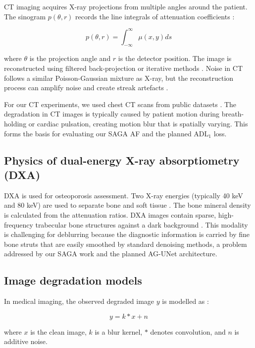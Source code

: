 CT imaging acquires X-ray projections from multiple angles around the patient. The sinogram \(p(\theta, r)\) records the line integrals of attenuation coefficients \citep{bushberg2011essential}:

\[
p(\theta, r) = \int_{-\infty}^{\infty} \mu(x, y) ds
\]

where \(\theta\) is the projection angle and \(r\) is the detector position. The image is reconstructed using filtered back-projection or iterative methods \citep{maier2018medical}. Noise in CT follows a similar Poisson-Gaussian mixture as X-ray, but the reconstruction process can amplify noise and create streak artefacts \citep{jin2017deep}.

For our CT experiments, we used chest CT scans from public datasets \citep{syed2024medical}. The degradation in CT images is typically caused by patient motion during breath-holding or cardiac pulsation, creating motion blur that is spatially varying. This forms the basis for evaluating our SAGA AF \citep{siju2026saga} and the planned ADL\(_1\) loss.

\subsection{Physics of dual-energy X-ray absorptiometry (DXA)}

DXA is used for osteoporosis assessment. Two X-ray energies (typically 40 keV and 80 keV) are used to separate bone and soft tissue \citep{bushberg2011essential}. The bone mineral density is calculated from the attenuation ratios. DXA images contain sparse, high-frequency trabecular bone structures against a dark background \citep{wani2021knee}. This modality is challenging for deblurring because the diagnostic information is carried by fine bone struts that are easily smoothed by standard denoising methods, a problem addressed by our SAGA work \citep{siju2026saga} and the planned AG-UNet architecture.

\subsection{Image degradation models}

In medical imaging, the observed degraded image \(y\) is modelled as \citep{jin2017deep}:

\[
y = k * x + n
\]

where \(x\) is the clean image, \(k\) is a blur kernel, \(*\) denotes convolution, and \(n\) is additive noise.


